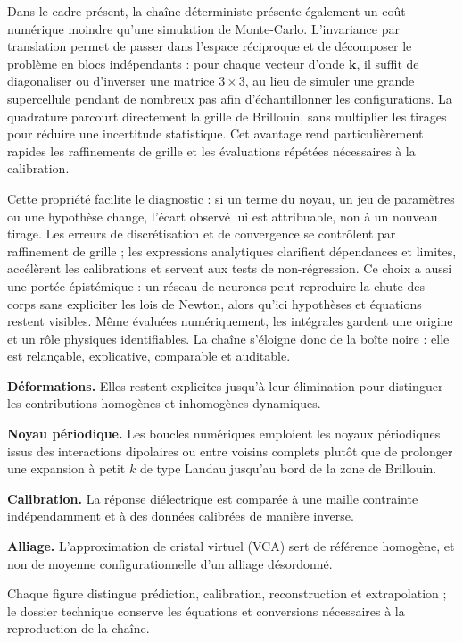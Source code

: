 \documentclass{rapportCS}
\begin{document}
Dans le cadre présent, la chaîne déterministe présente également un coût
numérique moindre qu'une simulation de Monte-Carlo. L'invariance par
translation permet de passer dans l'espace réciproque et de décomposer le
problème en blocs indépendants : pour chaque vecteur d'onde $\bm{k}$, il suffit
de diagonaliser ou d'inverser une matrice $3\times3$, au lieu de simuler une
grande supercellule pendant de nombreux pas afin d'échantillonner les
configurations. La quadrature parcourt directement la grille de Brillouin, sans
multiplier les tirages pour réduire une incertitude statistique. Cet avantage
rend particulièrement rapides les raffinements de grille et les évaluations
répétées nécessaires à la calibration.

Cette propriété facilite le diagnostic : si un terme du noyau, un jeu de
paramètres ou une hypothèse change, l'écart observé lui est attribuable, non à un
nouveau tirage. Les erreurs de discrétisation et de convergence se contrôlent par
raffinement de grille ; les expressions analytiques clarifient dépendances et
limites, accélèrent les calibrations et servent aux tests de non-régression. Ce
choix a aussi une portée épistémique : un réseau de neurones peut reproduire la
chute des corps sans expliciter les lois de Newton, alors qu'ici hypothèses et
équations restent visibles. Même évaluées numériquement, les intégrales gardent
une origine et un rôle physiques identifiables. La chaîne s'éloigne donc de la
boîte noire : elle est relançable, explicative, comparable et auditable.

\noindent\textbf{Déformations.} Elles restent explicites jusqu'à leur élimination
pour distinguer les contributions homogènes et inhomogènes dynamiques.

\noindent\textbf{Noyau périodique.} Les boucles numériques emploient les noyaux
périodiques issus des interactions dipolaires ou entre voisins complets plutôt
que de prolonger une expansion à petit $k$ de type Landau jusqu'au bord de la
zone de Brillouin.

\noindent\textbf{Calibration.} La réponse diélectrique est comparée à une maille
contrainte indépendamment et à des données calibrées de manière inverse.

\noindent\textbf{Alliage.} L'approximation de cristal virtuel (VCA) sert de
référence homogène, et non de moyenne configurationnelle d'un alliage désordonné.

Chaque figure distingue prédiction, calibration, reconstruction et extrapolation ;
le dossier technique conserve les équations et conversions nécessaires à la
reproduction de la chaîne.
\end{document}
